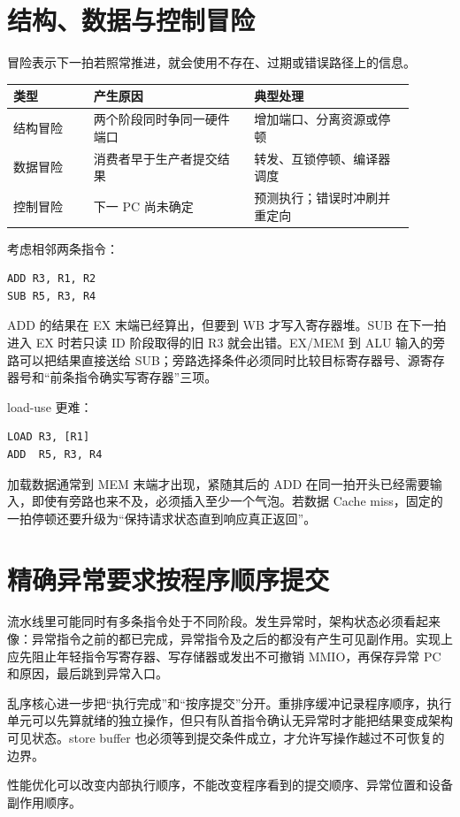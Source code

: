 \section{结构、数据与控制冒险}

冒险表示下一拍若照常推进，就会使用不存在、过期或错误路径上的信息。

\begin{longtable}{L{0.18\linewidth}L{0.36\linewidth}L{0.36\linewidth}}
\toprule
类型 & 产生原因 & 典型处理 \\
\midrule
结构冒险 & 两个阶段同时争同一硬件端口 & 增加端口、分离资源或停顿 \\
数据冒险 & 消费者早于生产者提交结果 & 转发、互锁停顿、编译器调度 \\
控制冒险 & 下一 PC 尚未确定 & 预测执行；错误时冲刷并重定向 \\
\bottomrule
\end{longtable}

考虑相邻两条指令：

\begin{lstlisting}
ADD R3, R1, R2
SUB R5, R3, R4
\end{lstlisting}

ADD 的结果在 EX 末端已经算出，但要到 WB 才写入寄存器堆。SUB 在下一拍进入 EX 时若只读 ID 阶段取得的旧 R3 就会出错。EX/MEM 到 ALU 输入的旁路可以把结果直接送给 SUB；旁路选择条件必须同时比较目标寄存器号、源寄存器号和“前条指令确实写寄存器”三项。

load-use 更难：

\begin{lstlisting}
LOAD R3, [R1]
ADD  R5, R3, R4
\end{lstlisting}

加载数据通常到 MEM 末端才出现，紧随其后的 ADD 在同一拍开头已经需要输入，即使有旁路也来不及，必须插入至少一个气泡。若数据 Cache miss，固定的一拍停顿还要升级为“保持请求状态直到响应真正返回”。

\section{精确异常要求按程序顺序提交}

流水线里可能同时有多条指令处于不同阶段。发生异常时，架构状态必须看起来像：异常指令之前的都已完成，异常指令及之后的都没有产生可见副作用。实现上应先阻止年轻指令写寄存器、写存储器或发出不可撤销 MMIO，再保存异常 PC 和原因，最后跳到异常入口。

乱序核心进一步把“执行完成”和“按序提交”分开。重排序缓冲记录程序顺序，执行单元可以先算就绪的独立操作，但只有队首指令确认无异常时才能把结果变成架构可见状态。store buffer 也必须等到提交条件成立，才允许写操作越过不可恢复的边界。

\begin{keyidea}
性能优化可以改变内部执行顺序，不能改变程序看到的提交顺序、异常位置和设备副作用顺序。
\end{keyidea}
